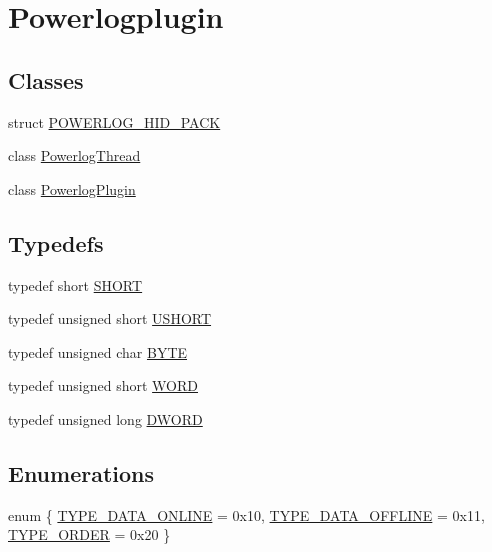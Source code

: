\hypertarget{group__powerlogplugin}{\section{\-Powerlogplugin}
\label{group__powerlogplugin}
}
\subsection*{\-Classes}
\begin{DoxyCompactItemize}
\item 
struct \hyperlink{struct_p_o_w_e_r_l_o_g___h_i_d___p_a_c_k}{\-P\-O\-W\-E\-R\-L\-O\-G\-\_\-\-H\-I\-D\-\_\-\-P\-A\-C\-K}
\item 
class \hyperlink{class_powerlog_thread}{\-Powerlog\-Thread}
\item 
class \hyperlink{class_powerlog_plugin}{\-Powerlog\-Plugin}
\end{DoxyCompactItemize}
\subsection*{\-Typedefs}
\begin{DoxyCompactItemize}
\item 
typedef short \hyperlink{group__powerlogplugin_ga9909bd3cf05f0906045f2ee85be4eeac}{\-S\-H\-O\-R\-T}
\item 
typedef unsigned short \hyperlink{group__powerlogplugin_ga5850d5316caf7f4cedd742fdf8cd7c02}{\-U\-S\-H\-O\-R\-T}
\item 
typedef unsigned char \hyperlink{group__powerlogplugin_ga4ae1dab0fb4b072a66584546209e7d58}{\-B\-Y\-T\-E}
\item 
typedef unsigned short \hyperlink{group__powerlogplugin_ga197942eefa7db30960ae396d68339b97}{\-W\-O\-R\-D}
\item 
typedef unsigned long \hyperlink{group__powerlogplugin_gad342ac907eb044443153a22f964bf0af}{\-D\-W\-O\-R\-D}
\end{DoxyCompactItemize}
\subsection*{\-Enumerations}
\begin{DoxyCompactItemize}
\item 
enum \{ \hyperlink{group__powerlogplugin_gga7ff5f2dff38e7639981794c43dc9167bac15fdb2710957e40a4a55c6ae5fe8e0d}{\-T\-Y\-P\-E\-\_\-\-D\-A\-T\-A\-\_\-\-O\-N\-L\-I\-N\-E} =  0x10, 
\hyperlink{group__powerlogplugin_gga7ff5f2dff38e7639981794c43dc9167ba6a82e6810b922850e28b6bef93e2bf6b}{\-T\-Y\-P\-E\-\_\-\-D\-A\-T\-A\-\_\-\-O\-F\-F\-L\-I\-N\-E} =  0x11, 
\hyperlink{group__powerlogplugin_gga7ff5f2dff38e7639981794c43dc9167bab0d06ab870c13d3fdbeb5500c7100cf2}{\-T\-Y\-P\-E\-\_\-\-O\-R\-D\-E\-R} =  0x20
 \}
\end{DoxyCompactItemize}


